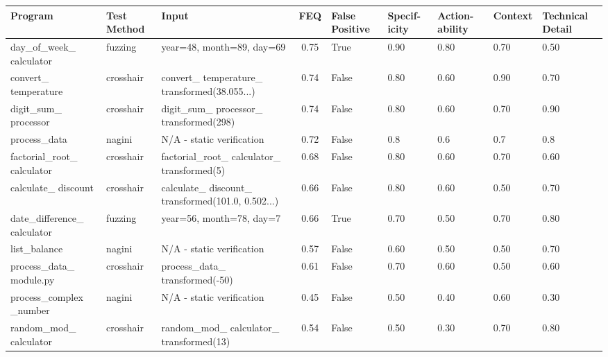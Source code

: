 \documentclass[8pt]{extarticle}
\begin{document}
\begin{table}[H]
\centering
\begin{tabular}{|p{2.8cm}|p{1.2cm}|p{2.5cm}|c|p{1.2cm}|p{1.2cm}|p{1.2cm}|p{1.2cm}|p{1.3cm}|}
\hline
\textbf{Program} & \textbf{Test Method} & \textbf{Input} & \textbf{FEQ} & \textbf{False Positive} & \textbf{Specif- icity} & \textbf{Action- ability} & \textbf{Context} & \textbf{Technical Detail} \\
\hline
day\_of\_week\_ calculator & fuzzing & year=48, month=89, day=69 & 0.75 & True & 0.90 & 0.80 & 0.70 & 0.50 \\
\hline
convert\_ temperature & crosshair & convert\_ temperature\_ transformed(38.055...) & 0.74 & False & 0.80 & 0.60 & 0.90 & 0.70 \\
\hline
digit\_sum\_ processor & crosshair & digit\_sum\_ processor\_ transformed(298) & 0.74 & False & 0.80 & 0.60 & 0.70 & 0.90 \\ \hline
process\_data & nagini & N/A - static verification & 0.72 & False & 0.8 & 0.6 & 0.7 & 0.8 \\ \hline
factorial\_root\_ calculator & crosshair & factorial\_root\_ calculator\_ transformed(5) & 0.68 & False & 0.80 & 0.60 & 0.70 & 0.60 \\ \hline
calculate\_ discount & crosshair & calculate\_ discount\_ transformed(101.0, 0.502...) & 0.66 & False & 0.80 & 0.60 & 0.50 & 0.70 \\ \hline
date\_difference\_ calculator & fuzzing & year=56, month=78, day=7 & 0.66 & True & 0.70 & 0.50 & 0.70 & 0.80 \\ \hline
list\_balance & nagini & N/A - static verification & 0.57 & False & 0.60 & 0.50 & 0.50 & 0.70 \\ \hline
process\_data\_ module.py & crosshair & process\_data\_ transformed(-50) & 0.61 & False & 0.70 & 0.60 & 0.50 & 0.60 \\ \hline
process\_complex \_number & nagini & N/A - static verification & 0.45 & False & 0.50 & 0.40 & 0.60 & 0.30 \\ \hline
random\_mod\_ calculator & crosshair & random\_mod\_ calculator\_ transformed(13) & 0.54 & False & 0.50 & 0.30 & 0.70 & 0.80 \\ \hline

\end{tabular}
\end{table}
\end{document}
